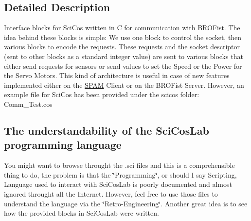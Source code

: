 \subsection{Detailed Description}
Interface blocks for SciCos written in C for communication with BROFist. The idea behind these blocks is simple: We use one block to control the socket, then various blocks to encode the requests. These requests and the socket descriptor (sent to other blocks as a standard integer value) are sent to various blocks that either send requests for sensors or send values to set the Speed or the Power for the Servo Motors. This kind of architecture is useful in case of new features implemented either on the \hyperlink{main_SPAM}{SPAM} Client or on the BROFist Server. However, an example file for SciCos has been provided under the {\ttfamily scicos} folder: {\ttfamily Comm\_\-Test.cos} \hypertarget{group___b_r_o_sci_cos_SimilOctave}{}\subsection{The understandability of the SciCosLab programming language}\label{group___b_r_o_sci_cos_SimilOctave}
You might want to browse throught the {\ttfamily }.sci files and this is a comprehensible thing to do, the problem is that the \char`\"{}Programming\char`\"{}, or should I say Scripting, Language used to interact with SciCosLab is poorly documented and almost ignored throught all the Internet. However, feel free to use those files to understand the language via the \char`\"{}Retro-\/Engineering\char`\"{}. Another great idea is to see how the provided blocks in SciCosLab were written. 